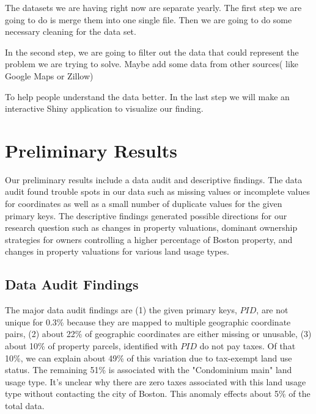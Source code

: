 \documentclass[12pt]{article}
\begin{document}
The datasets we are having right now are separate yearly. The first step 
we are going to do is merge them into one single file. Then we are going 
to do some necessary cleaning for the data set. 

In the second step, we are going to filter out the data that could 
represent the problem we are trying to solve. Maybe add some data from 
other sources( like Google Maps or Zillow)

To help people understand the data better. In the last step we will make 
an interactive Shiny application to visualize our finding. 


\section*{Preliminary Results}

Our preliminary results include a data audit and descriptive findings.
The data audit found trouble spots in our data such as missing values or
incomplete values for coordinates as well as a small number of duplicate
values for the given primary keys. The descriptive findings generated
possible directions for our research question such as changes in 
property valuations, dominant ownership strategies for owners 
controlling a higher percentage of Boston property, and changes in
property valuations for various land usage types.

\subsection*{Data Audit Findings}

The major data audit findings are (1) the given primary keys, $PID$, are 
not unique for 0.3\% because they are mapped to multiple geographic 
coordinate pairs, (2) about 22\% of geographic coordinates are either 
missing or unusable, (3) about 10\% of property parcels, identified with
$PID$ do not pay taxes. Of that 10\%, we can explain about 49\% of this 
variation due to tax-exempt land use status. The remaining 51\% is 
associated with the "Condominium main" land usage type. It's unclear why 
there are zero taxes associated with this land usage type without 
contacting the city of Boston. This anomaly effects about 5\% of the 
total data.
\end{document}

